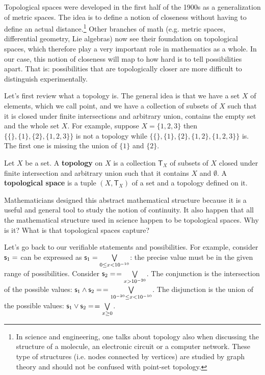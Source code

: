 \documentclass[11pt,letterpaper,fleqn]{memoir} %
\begin{document}
Topological spaces were developed in the first half of the 1900s as a generalization of metric spaces. The idea is to define a notion of closeness without having to define an actual distance.\footnote{In science and engineering, one talks about topology also when discussing the structure of a molecule, an electronic circuit or a computer network. These type of structures (i.e. nodes connected by vertices) are studied by graph theory and should not be confused with point-set topology.} Other branches of math (e.g. metric spaces, differential geometry, Lie algebras) now see their foundation on topological spaces, which therefore play a very important role in mathematics as a whole. In our case, this notion of closeness will map to how hard is to tell possibilities apart. That is: possibilities that are topologically closer are more difficult to distinguish experimentally.

Let's first review what a topology is. The general idea is that we have a set $X$ of elements, which we call point, and we have a collection of subsets of $X$ such that it is closed under finite intersections and arbitrary union, contains the empty set and the whole set $X$. For example, suppose $X=\{1,2,3\}$ then $\{\{\}, \{1\}, \{2\},\{1,2,3\}\}$ is not a topology while $\{\{\}, \{1\}, \{2\},\{1,2\},\{1,2,3\}\}$ is. The first one is missing the union of $\{1\}$ and $\{2\}$.

\begin{mathSection}
	\begin{defn}
		Let $X$ be a set. A \textbf{topology} on $X$ is a collection $\mathsf{T}_X$ of subsets of $X$ closed under finite intersection and arbitrary union such that it contains $X$ and $\emptyset$. A \textbf{topological space} is a tuple $(X, \mathsf{T}_X)$ of a set and a topology defined on it.
	\end{defn}
\end{mathSection}

Mathematicians designed this abstract mathematical structure because it is a useful and general tool to study the notion of continuity. It also happen that all the mathematical structure used in science happen to be topological spaces. Why is it? What is that topological spaces capture?

Let's go back to our verifiable statements and possibilities. For example, consider $\mathsf{s}_1=$ can be expressed as $\mathsf{s}_1=\bigvee\limits_{0\leq x<10^{-10}}$: the precise value must be in the given range of possibilities. Consider $\mathsf{s}_2=$$=\bigvee\limits_{x>10^{-20}}$. The conjunction is the intersection of the possible values: $\mathsf{s}_1\wedge\mathsf{s}_2=$$=\bigvee\limits_{10^{-20}\leq x<10^{-10}}$. The disjunction is the union of the possible values: $\mathsf{s}_1\vee\mathsf{s}_2=$$=\bigvee\limits_{x\geq0}$.
\end{document}
